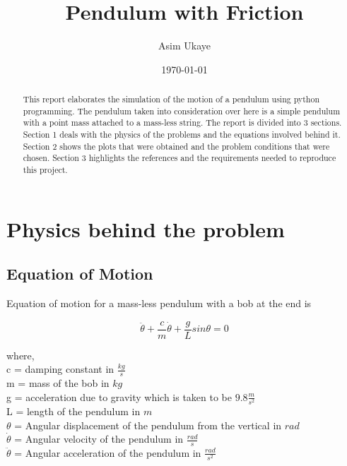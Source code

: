 \documentclass[12pt, a4paper]{report}
\title{Pendulum with Friction}
\author{Asim Ukaye}
\affil{Roll. No.: 130010012}
\date{\today}
\begin{document}
\maketitle

\begin{abstract}
This report elaborates the simulation of the motion of a pendulum using python programming. The pendulum taken into consideration over here is a simple pendulum with a point mass attached to a mass-less string. The report is divided into 3 sections. Section 1 deals with the physics of the problems and the equations involved behind it. Section 2 shows the plots that were obtained and the problem conditions that were chosen. Section 3 highlights the references and the requirements needed to reproduce this project.  %

\end{abstract}


\section*{Physics behind the problem}
\subsection*{Equation of Motion}
Equation of motion for a mass-less pendulum with a bob at the end is 

\begin{equation}
\label{equation1}
\ddot{\theta} + \frac{c}{m}\dot{\theta} + \frac{g}{L}sin\theta = 0
\end{equation}

where,\\
c = damping constant in $\frac{kg}{s}$\\
m = mass of the bob in $kg$\\
g = acceleration due to gravity which is taken to be $9.8\frac{m}{s^2}$\\
L = length of the pendulum in $m$\\
$\theta$ = Angular displacement of the pendulum from the vertical in $rad$\\
$\dot{\theta}$ = Angular velocity of the pendulum in $\frac{rad}{s}$\\
$\ddot{\theta}$ = Angular acceleration of the pendulum in $\frac{rad}{s^2}$\\
\end{document}
